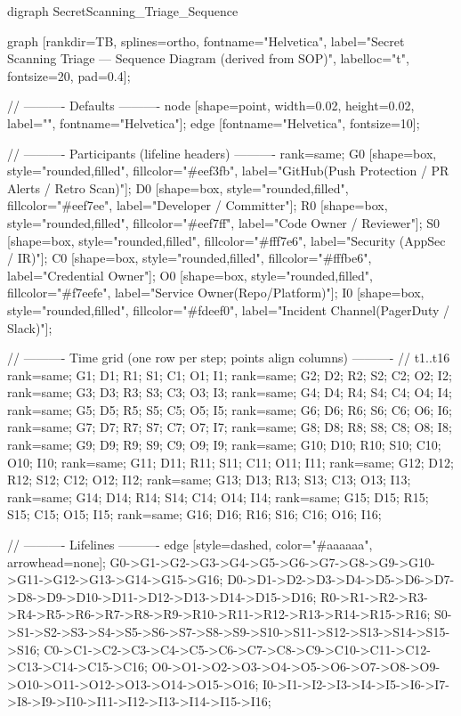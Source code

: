 digraph SecretScanning_Triage_Sequence {
  graph [rankdir=TB, splines=ortho, fontname="Helvetica",
         label="Secret Scanning Triage — Sequence Diagram (derived from SOP)",
         labelloc="t", fontsize=20, pad=0.4];

  // ---------- Defaults ----------
  node [shape=point, width=0.02, height=0.02, label="", fontname="Helvetica"];
  edge [fontname="Helvetica", fontsize=10];

  // ---------- Participants (lifeline headers) ----------
  { rank=same;
    G0 [shape=box, style="rounded,filled", fillcolor="#eef3fb",
        label="GitHub\n(Push Protection / PR Alerts / Retro Scan)"];
    D0 [shape=box, style="rounded,filled", fillcolor="#eef7ee",
        label="Developer / Committer"];
    R0 [shape=box, style="rounded,filled", fillcolor="#eef7ff",
        label="Code Owner / Reviewer"];
    S0 [shape=box, style="rounded,filled", fillcolor="#fff7e6",
        label="Security (AppSec / IR)"];
    C0 [shape=box, style="rounded,filled", fillcolor="#fffbe6",
        label="Credential Owner"];
    O0 [shape=box, style="rounded,filled", fillcolor="#f7eefe",
        label="Service Owner\n(Repo/Platform)"];
    I0 [shape=box, style="rounded,filled", fillcolor="#fdeef0",
        label="Incident Channel\n(PagerDuty / Slack)"];
  }

  // ---------- Time grid (one row per step; points align columns) ----------
  // t1..t16
  {rank=same; G1; D1; R1; S1; C1; O1; I1;}
  {rank=same; G2; D2; R2; S2; C2; O2; I2;}
  {rank=same; G3; D3; R3; S3; C3; O3; I3;}
  {rank=same; G4; D4; R4; S4; C4; O4; I4;}
  {rank=same; G5; D5; R5; S5; C5; O5; I5;}
  {rank=same; G6; D6; R6; S6; C6; O6; I6;}
  {rank=same; G7; D7; R7; S7; C7; O7; I7;}
  {rank=same; G8; D8; R8; S8; C8; O8; I8;}
  {rank=same; G9; D9; R9; S9; C9; O9; I9;}
  {rank=same; G10; D10; R10; S10; C10; O10; I10;}
  {rank=same; G11; D11; R11; S11; C11; O11; I11;}
  {rank=same; G12; D12; R12; S12; C12; O12; I12;}
  {rank=same; G13; D13; R13; S13; C13; O13; I13;}
  {rank=same; G14; D14; R14; S14; C14; O14; I14;}
  {rank=same; G15; D15; R15; S15; C15; O15; I15;}
  {rank=same; G16; D16; R16; S16; C16; O16; I16;}

  // ---------- Lifelines ----------
  edge [style=dashed, color="#aaaaaa", arrowhead=none];
  G0->G1->G2->G3->G4->G5->G6->G7->G8->G9->G10->G11->G12->G13->G14->G15->G16;
  D0->D1->D2->D3->D4->D5->D6->D7->D8->D9->D10->D11->D12->D13->D14->D15->D16;
  R0->R1->R2->R3->R4->R5->R6->R7->R8->R9->R10->R11->R12->R13->R14->R15->R16;
  S0->S1->S2->S3->S4->S5->S6->S7->S8->S9->S10->S11->S12->S13->S14->S15->S16;
  C0->C1->C2->C3->C4->C5->C6->C7->C8->C9->C10->C11->C12->C13->C14->C15->C16;
  O0->O1->O2->O3->O4->O5->O6->O7->O8->O9->O10->O11->O12->O13->O14->O15->O16;
  I0->I1->I2->I3->I4->I5->I6->I7->I8->I9->I10->I11->I12->I13->I14->I15->I16;

}
